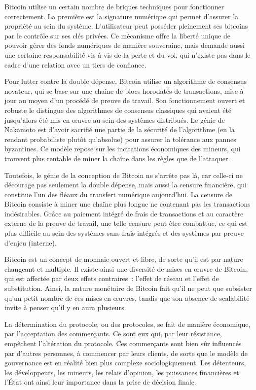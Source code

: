 Bitcoin utilise un certain nombre de briques techniques pour fonctionner correctement. La première est la signature numérique qui permet d'assurer la propriété au sein du système. L'utilisateur peut posséder pleinement ses bitcoins par le contrôle sur ses clés privées. Ce mécanisme offre la liberté unique de pouvoir gérer des fonds numériques de manière souveraine, mais demande aussi une certaine responsabilité vis-à-vis de la perte et du vol, qui n'existe pas dans le cadre d'une relation avec un tiers de confiance.

Pour lutter contre la double dépense, Bitcoin utilise un algorithme de consensus novateur, qui se base sur une chaîne de blocs horodatés de transactions, mise à jour au moyen d'un procédé de preuve de travail. Son fonctionnement ouvert et robuste le distingue des algorithmes de consensus classiques qui avaient été jusqu'alors été mis en œuvre au sein des systèmes distribués. Le génie de Nakamoto est d'avoir sacrifié une partie de la sécurité de l'algorithme (en la rendant probabiliste plutôt qu'absolue) pour assurer la tolérance aux pannes byzantines. Ce modèle repose sur les incitations économiques des mineurs, qui trouvent plus rentable de miner la chaîne dans les règles que de l'attaquer.

Toutefois, le génie de la conception de Bitcoin ne s'arrête pas là, car celle-ci ne décourage pas seulement la double dépense, mais aussi la censure financière, qui constitue l'un des fléaux du transfert numérique aujourd'hui. La censure de Bitcoin consiste à miner une chaîne plus longue ne contenant pas les transactions indésirables. Grâce au paiement intégré de frais de transactions et au caractère externe de la preuve de travail, une telle censure peut être combattue, ce qui est plus difficile au sein des systèmes sans frais intégrés et des systèmes par preuve d'enjeu (interne).

Bitcoin est un concept de monnaie ouvert et libre, de sorte qu'il est par nature changeant et multiple. Il existe ainsi une diversité de mises en œuvre de Bitcoin, qui est affectée par deux effets contraires~: l'effet de réseau et l'effet de substitution. Ainsi, la nature monétaire de Bitcoin fait qu'il ne peut que subsister qu'un petit nombre de ces mises en œuvres, tandis que son absence de scalabilité invite à penser qu'il y en aura plusieurs.

La détermination du protocole, ou des protocoles, se fait de manière économique, par l'acceptation des commerçants. Ce sont eux qui, par leur résistance, empêchent l'altération du protocole. Ces commerçants sont bien sûr influencés par d'autres personnes, à commencer par leurs clients, de sorte que le modèle de gouvernance est en réalité bien plus complexe sociologiquement. Les détenteurs, les développeurs, les mineurs, les relais d'opinion, les puissances financières et l'État ont ainsi leur importance dans la prise de décision finale.

